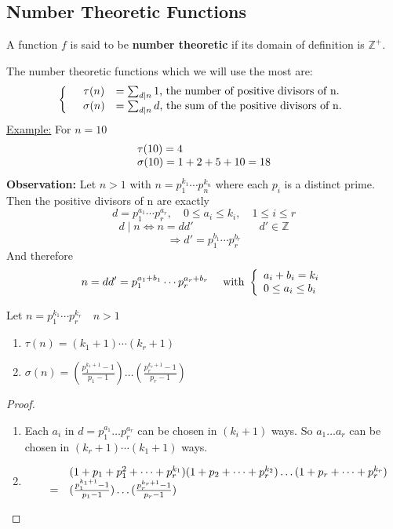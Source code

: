 \documentclass{report}
\begin{document}
\subsection*{Number Theoretic Functions}
\begin{defi}
	A function $f$ is said to be \textbf{number theoretic} if its domain of definition is $\mathbb{Z}^+$.
\end{defi}
The number theoretic functions which we will use the most are:
\[
\left \{
\begin{array}{l c l}
&\tau(n)& = \sum_{d \mid n}1 \text{,   the number of positive divisors of n.}\\
&\sigma(n)&= \sum_{d \mid n}d \text{,   the sum of the positive divisors of n.}\\
\end{array}
\right.
\]
\underline{Example:} For $n=10$
\[
\begin{array}{l c l}
\tau(10)=4\\
\sigma(10)=1+2+5+10=18\\
\end{array}
\]
\textbf{Observation:} Let $n>1$ with  $n=p_1^{k_1} \cdots p_n^{k_n}$ where each $p_i$ is a distinct prime.\\
Then the positive divisors of n are exactly
\[d=p_1^{a_1} \cdots p_r^{a_r},\quad 0 \leq a_i \leq k_i, \quad 1\leq i\leq r \]
\[d\mid n \iff n=dd' \qquad \qquad \qquad d' \in \mathbb{Z}\]
\[\Rightarrow d' = p_1^{b_1}\cdots p_r^{b_r}\]
And therefore \[ n=dd' = p_1^{a_1+b_1} \cdots p_r^{a_r+b_r} \quad \text{ with } 
					\left \{
					\begin{array}{l c l} 
					a_i+b_i=k_i\\
					0 \leq a_i \leq b_i\\
					\end{array}
					\right.
\]
\newpage
\begin{thm} Let $n=p_1^{k_1} \cdots p_r^{k_r} \quad n>1$ \\
	\begin{enumerate}
		\item $\tau(n)=(k_1+1) \cdots (k_r+1)$
		\item $\sigma(n)=(\frac{p_1^{k_1+1}-1}{p_1-1})\dots(\frac{p_r^{k_r+1}-1}{p_r-1})$
	\end{enumerate}
\end{thm}
\begin{proof}
	\begin{enumerate}
		\item Each $a_i$ in $d=p_1^{a_1} \dots p_r^{a_r}$ can be chosen in $(k_i+1)$ ways. So $a_1 \dots a_r$ can be chosen in $(k_r+1) \cdots (k_1+1)$ ways.
		\item \[
						\begin{array}{l c l}
						&&(1+p_1+p_1^2+\dots+p_r^{k_1})(1+p_2+\dots+p_r^{k_2})\dots(1+p_r+\dots+p_r^{k_r})\\
						&=& (\frac{p_1^{k_1+1}-1}{p_1-1})\dots(\frac{p_r^{k_r+1}-1}{p_r-1})\\
						\end{array}
					\]
	\end{enumerate}
\end{proof}
\end{document}
